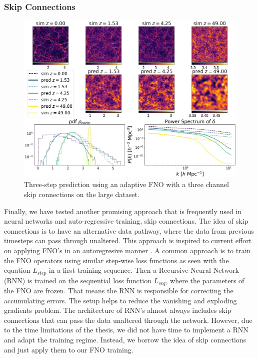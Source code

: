 \documentclass{article}
\begin{document}
\subsubsection{Skip Connections}


\begin{figure}[h]
    \centering
    \includegraphics[width=0.9\linewidth]{img/three_steps_pred.jpg}
    \caption{Three-step prediction using an adaptive FNO with a three channel skip connections on the large dataset.}
    \label{fig:mss}
\end{figure}


Finally, we have tested another promising approach that is frequently used in neural networks and auto-regressive training, skip connections. The idea of skip connections is to have an alternative data pathway, where the data from previous timesteps can pass through unaltered.  This approach is inspired to current effort on applying FNO's in an autoregresive manner \citep{li2020fourier, gopakumar2023fourier}. A common approach is to train the FNO operators using similar step-wise loss functions as seen with the equation $L_{step}$ in a first training sequence. Then a Recursive Neural Network (RNN) is trained on the sequential loss function $L_{seq}$, where the parameters of the FNO are frozen. That means the RNN is responsible for correcting the accumulating errors. The setup helps to reduce the vanishing and exploding gradients problem. The architecture of RNN's almost always includes skip connections that can pass the data unaltered through the network. However, due to the time limitations of the thesis, we did not have time to implement a RNN and adapt the training regime. Instead, we borrow the idea of skip connections and just apply them to our FNO training.
\end{document}
